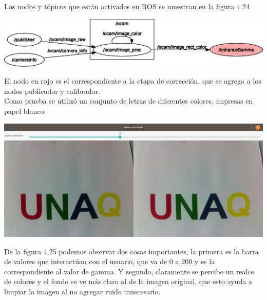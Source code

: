 Los nodos y tópicos que están activados en ROS se muestran en la figura 4.24
\begin{center}
	\includegraphics[width=1.0 \textwidth]{Contenido/Cuerpo/Capitulo4/Fig14.eps}
	\label{Fig9}
\end{center}
El nodo en rojo es el correspondiente a la etapa de corrección, que se agrega a los nodos
publicador y calibrador.\\
Como prueba se utilizó un conjunto de letras de diferentes colores, impresas en papel blanco.
\begin{center}
	\includegraphics[width=0.85 \textwidth]{Contenido/Cuerpo/Capitulo4/Fig13.eps}
	\label{Fig9}
\end{center}
De la figura 4.25 podemos observar dos cosas importantes, la primera es la barra de valores
que interactúan con el usuario, que va de 0 a 200 y es la correspondiente al valor de gamma. Y
segundo, claramente se percibe un realce de colores y el fondo se ve más claro al de la imagen original, que esto
ayuda a limpiar la imagen al no agregar ruido innecesario.


